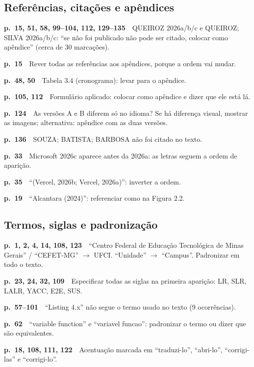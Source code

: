 \documentclass[11pt,a4paper]{article}
\newcommand{\pg}[1]{\textbf{p.~#1}\ \ }
\begin{document}
\subsection*{Referências, citações e apêndices}
\begin{checklist}
  \item \pg{15, 51, 58, 99--104, 112, 129--135}QUEIROZ 2026a/b/c e QUEIROZ; SILVA 2026a/b/c: “se não foi publicado não pode ser citado, colocar como apêndice” (cerca de 30 marcações).
  \item \pg{15}Rever todas as referências aos apêndices, porque a ordem vai mudar.
  \item \pg{48, 50}Tabela 3.4 (cronograma): levar para o apêndice.
  \item \pg{105, 112}Formulário aplicado: colocar como apêndice e dizer que ele está lá.
  \item \pg{124}As versões A e B diferem só no idioma? Se há diferença visual, mostrar as imagens; alternativa: apêndice com as duas versões.
  \item \pg{136}SOUZA; BATISTA; BARBOSA não foi citado no texto.
  \item \pg{33}Microsoft 2026c aparece antes da 2026a: as letras seguem a ordem de aparição.
  \item \pg{35}“(Vercel, 2026b; Vercel, 2026a)”: inverter a ordem.
  \item \pg{19}“Alcantara (2024)”: referenciar como na Figura 2.2.
\end{checklist}
\subsection*{Termos, siglas e padronização}
\begin{checklist}
  \item \pg{1, 2, 4, 14, 108, 123}“Centro Federal de Educação Tecnológica de Minas Gerais” / “CEFET-MG” $\rightarrow$ UFCI. “Unidade” $\rightarrow$ “Campus”. Padronizar em todo o texto.
  \item \pg{23, 24, 32, 109}Especificar todas as siglas na primeira aparição: LR, SLR, LALR, YACC, E2E, SUS.
  \item \pg{57--101}“Listing 4.x” não segue o termo usado no texto (9 ocorrências).
  \item \pg{62}“variable function” e “variavel funcao”: padronizar o termo ou dizer que são equivalentes.
  \item \pg{18, 108, 111, 122}Acentuação marcada em “traduzi-lo”, “abri-lo”, “corrigi-las” e “corrigi-lo”.
\end{checklist}
\newpage
\end{document}
